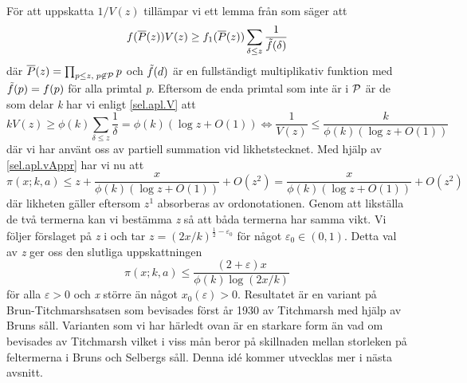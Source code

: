 För att uppskatta \(1/V(z)\) tillämpar vi ett lemma från \cite[lemma 7.2.3]{cojocarumurty} som säger att
\begin{equation}
    f(\overline{P}(z))V(z) \geq f_1(\overline{P}(z))\sum_{\delta \leq z}\frac{1}{\Tilde{f}(\delta)}\label{sel.apl.V}
\end{equation}
där \(\overline{P}(z) = \prod_{p\leq z,\; p \not \in \P}p\) och \(\Tilde{f}(d)\) är en fullständigt multiplikativ funktion med \(\Tilde{f}(p) = f(p)\) för alla primtal \textit{p}. 
Eftersom de enda primtal som inte är i \(\P\) är de som delar \textit{k} har vi enligt \eqref{sel.apl.V} att 
\begin{equation}
    kV(z) \geq \phi(k) \sum_{\delta \leq z}\frac{1}{\delta} = \phi(k)(\log z + O(1)) \iff \frac{1}{V(z)} \leq \frac{k}{\phi(k)(\log z + O(1))}\label{sel.apl.vAppr}
\end{equation}
där vi har använt oss av partiell summation vid likhetstecknet. 
Med hjälp av \eqref{sel.apl.vAppr} har vi nu att
\begin{equation}
     \pi(x;k,a) \leq z + \frac{x}{\phi(k)(\log z + O(1))} + O(z^2) = \frac{x}{\phi(k)(\log z + O(1))} + O(z^2)\nonumber
\end{equation}
där likheten gäller eftersom \(z^1\) absorberas av ordonotationen. 
Genom att likställa de två termerna kan vi bestämma \textit{z} så att båda termerna har samma vikt. Vi följer förslaget på \textit{z} i \cite[s. 127]{cojocarumurty} och tar \(z = (2x/k)^{\frac{1}{2}-\varepsilon_0}\) för något \(\varepsilon_0\in(0, 1)\). Detta val av \textit{z} ger oss den slutliga uppskattningen
\begin{equation}
    \pi(x;k,a) \leq \frac{(2+\varepsilon)x}{\phi(k)\log(2x/k)}\nonumber
\end{equation}
för alla \(\varepsilon > 0\) och \textit{x} större än något \(x_0(\varepsilon) >0\). 
Resultatet är en variant på Brun-Titchmarshsatsen som bevisades först år 1930 av Titchmarsh \cite{BrunTitch} med hjälp av Bruns såll.
Varianten som vi har härledt ovan är en starkare form än vad om bevisades av Titchmarsh vilket i viss mån beror på skillnaden mellan storleken på feltermerna i Bruns och Selbergs såll.
Denna idé kommer utvecklas mer i nästa avsnitt.